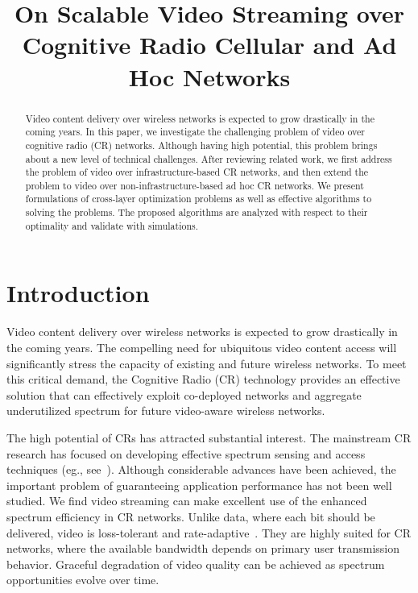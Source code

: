 \documentclass[12pt,onecolumn,draftclsnofoot]{IEEEtran} %
\newcommand{\ls}[1]  %
   {\dimen0=\fontdimen6\the\font
    \lineskip=#1\dimen0
    \advance\lineskip.5\fontdimen5\the\font
    \advance\lineskip-\dimen0
    \lineskiplimit=.9\lineskip
    \baselineskip=\lineskip
    \advance\baselineskip\dimen0
    \normallineskip\lineskip
    \normallineskiplimit\lineskiplimit
    \normalbaselineskip\baselineskip
    \ignorespaces
   }
\begin{document}
\title{On Scalable Video Streaming over Cognitive Radio Cellular and Ad Hoc Networks}

\author{
}

\maketitle

\pagestyle{plain}\thispagestyle{plain}


\begin{abstract}
Video content delivery over wireless networks is expected to grow drastically in the coming years. In this paper, we investigate the challenging problem of video over cognitive radio (CR) networks. Although having high potential, this problem brings about a new level of technical challenges. After reviewing related work, we first address the problem of video over infrastructure-based CR networks, and then extend the problem to video over non-infrastructure-based ad hoc CR networks. We present formulations of cross-layer optimization problems as well as effective algorithms to solving the problems. The proposed algorithms are analyzed with respect to their optimality and validate with simulations.  
\end{abstract}


\section{Introduction}
%
Video content delivery over wireless networks is expected to grow drastically in the coming years. The compelling need for ubiquitous video content access will significantly stress the capacity of existing and future wireless networks. To meet this critical demand, the Cognitive Radio (CR) technology provides an effective solution that can effectively exploit co-deployed networks and aggregate underutilized spectrum for future video-aware wireless networks.

The high potential of CRs has attracted substantial interest. The mainstream CR research has focused on developing effective spectrum sensing and access techniques (eg., see~\cite{Zhao07a, Zhao09}). Although considerable advances have been achieved, the important problem of guaranteeing application performance has not been well studied.  We find video streaming can make excellent use of the enhanced spectrum efficiency in CR networks.  Unlike data, where each bit should be delivered, video is loss-tolerant and rate-adaptive~\cite{Mao05-wcomm, Mao05-icc}.  They are highly suited for CR networks, where the available bandwidth depends on primary user transmission behavior.  Graceful degradation of video quality can be achieved as spectrum opportunities evolve over time.
\end{document}
